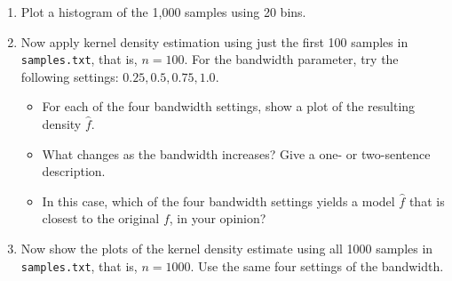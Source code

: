 \documentclass{article}
\begin{document}
\begin{enumerate}
\begin{enumerate}
\item Plot a histogram of the 1,000 samples using 20 bins.

\item Now apply kernel density estimation using just the first 100 samples in \texttt{samples.txt}, that is, $n=100$. For the bandwidth parameter, try the following settings: $0.25, 0.5, 0.75, 1.0$.
\begin{itemize}
\item For each of the four bandwidth settings, show a plot of the resulting density $\widehat{f}$.
\item What changes as the bandwidth increases? Give a one- or two-sentence description.
\item In this case, which of the four bandwidth settings yields a model $\widehat{f}$ that is closest to the original $f$, in your opinion?
\end{itemize}

\item Now show the plots of the kernel density estimate using all 1000 samples in \texttt{samples.txt}, that is, $n=1000$. Use the same four settings of the bandwidth.
\end{enumerate}

\end{enumerate}
\end{document}
